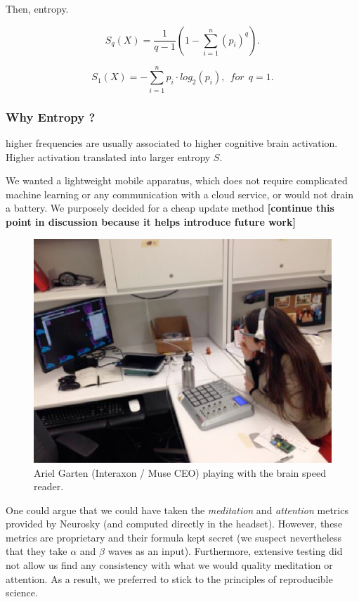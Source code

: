 Then, entropy.

\begin{equation}
\label{eq:tsallis}
S_q(X) = \frac{1}{q-1} \left( 1 - \sum_{i=1}^n (p_i)^q \right).
\end{equation}

\begin{equation}
\label{eq:shannon}
S_1(X) = - \sum_{i=1}^n p_i\cdot log_{2}(p_i), ~~for~~q=1.
\end{equation}

\subsubsection{Why Entropy ?}

higher frequencies are usually associated to higher cognitive brain activation. Higher activation  translated into larger entropy $S$.


We wanted a lightweight mobile apparatus, which does not require complicated machine learning or any communication with a cloud service, or would not drain a battery. We purposely decided for a cheap update method {\bf [continue this point in discussion because it helps introduce future work]}

\begin{figure}[!t]
\centering
\includegraphics[width=0.9\columnwidth]{../figures/ariel.eps}
\caption{Ariel Garten (Interaxon / Muse CEO) playing with the brain speed reader.}
\label{fig:ariel}
\end{figure}

One could argue that we could have taken the {\it meditation} and {\it attention} metrics provided by Neurosky (and computed directly in the headset). However, these metrics are proprietary and their formula kept secret (we suspect nevertheless that they take $\alpha$ and $\beta$ waves  as an input). Furthermore, extensive testing did not allow us find any consistency with what we would quality meditation or attention. As a result, we preferred to stick to the principles of reproducible science.

